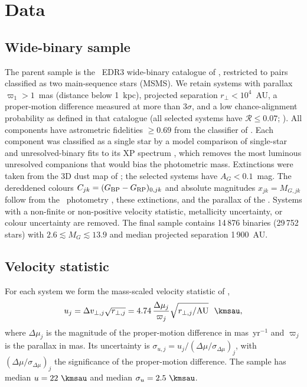 \section{Data}
\label{sec:data}

\subsection{Wide-binary sample}

The parent sample is the \gaia\ EDR3 wide-binary catalogue of
\citet{ElBadry2021MillionBinaries}, restricted to pairs classified as two
main-sequence stars (MSMS).  We retain systems with parallax
$\varpi_1>1$~mas (distance below 1~kpc), projected separation
$r_\perp<10^4$~AU, a proper-motion difference measured at more than
$3\sigma$, and a low chance-alignment probability as defined in that
catalogue (all selected systems have $\mathcal R\le0.07$;
).  All components have astrometric
fidelities $\ge0.69$ from the classifier of \citet{Rybizki2022}
.  Each component was
classified as a single star by a model comparison of single-star and
unresolved-binary fits to its XP spectrum
, which removes the most luminous unresolved companions that would
bias the photometric mass.  Extinctions were taken from the 3D dust map of
\citet{Edenhofer2024} ; the selected systems have $A_G<0.1$~mag.  The
dereddened colours $C_{jk}=(G_{\rm BP}-G_{\rm RP})_{0,jk}$ and absolute
magnitudes $x_{jk}=M_{G,jk}$ follow from the \gaia\ photometry
\citep{Riello2021GaiaEDR3Photometry}, these extinctions, and the parallax of
the .  Systems with a non-finite or non-positive velocity
statistic, metallicity uncertainty, or colour uncertainty are removed.  The
final sample contains 14\,876 binaries (29\,752 stars) with
$2.6\lesssim M_G\lesssim13.9$ and median projected separation 1\,900~AU.

\subsection{Velocity statistic}

For each system we form the mass-scaled velocity statistic of
\citet{Hwang2024DynamicalMasses},
\begin{equation}
 u_j=\Delta v_{\perp,j}\sqrt{r_{\perp,j}}
    =4.74\,\frac{\Delta\mu_j}{\varpi_j}\sqrt{r_{\perp,j}/{\rm AU}}
    \ \ \kmsau,
 \label{eq:u}
\end{equation}
where $\Delta\mu_j$ is the magnitude of the proper-motion difference in
mas~yr$^{-1}$ and $\varpi_j$ is the parallax in mas.  Its uncertainty is
$\sigma_{u,j}=u_j/(\Delta\mu/\sigma_{\Delta\mu})_j$, with
$(\Delta\mu/\sigma_{\Delta\mu})_j$ the significance of the proper-motion
difference.  The sample has median $u=22~\kmsau$ and median
$\sigma_u=2.5~\kmsau$.

